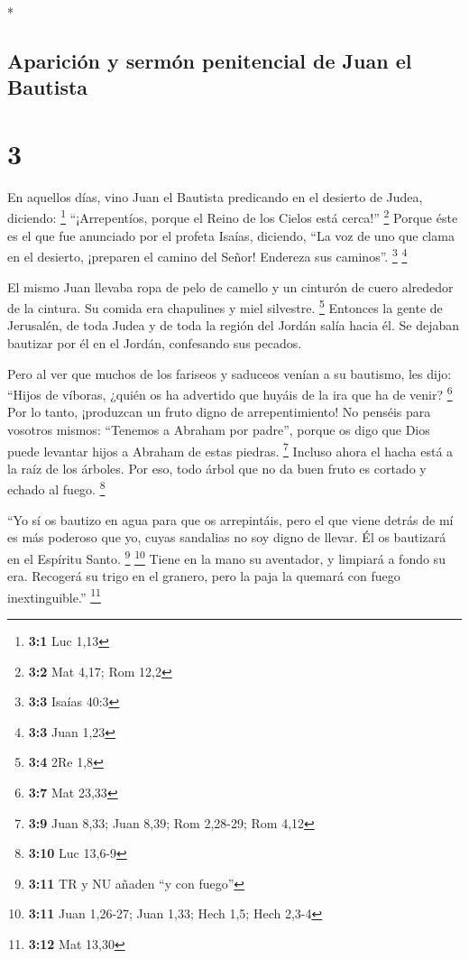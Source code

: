 \begin{paracol}{2}
\begin{otherlanguage}{english}
\end{otherlanguage}

\switchcolumn[0]*

\hypertarget{apariciuxf3n-y-sermuxf3n-penitencial-de-juan-el-bautista}{%
\subsection{Aparición y sermón penitencial de Juan el
Bautista}\label{apariciuxf3n-y-sermuxf3n-penitencial-de-juan-el-bautista}}

\hypertarget{section-4}{%
\section{3}\label{section-4}}

 En aquellos días, vino Juan el Bautista predicando en el
desierto de Judea, diciendo: \footnote{\textbf{3:1} Luc 1,13}
 ``¡Arrepentíos, porque el Reino de los Cielos está
cerca!'' \footnote{\textbf{3:2} Mat 4,17; Rom 12,2} 
Porque éste es el que fue anunciado por el profeta Isaías, diciendo,
``La voz de uno que clama en el desierto, ¡preparen el camino del Señor!
Endereza sus caminos''. \footnote{\textbf{3:3} Isaías 40:3} \footnote{\textbf{3:3}
  Juan 1,23}

 El mismo Juan llevaba ropa de pelo de camello y un
cinturón de cuero alrededor de la cintura. Su comida era chapulines y
miel silvestre. \footnote{\textbf{3:4} 2Re 1,8}  Entonces
la gente de Jerusalén, de toda Judea y de toda la región del Jordán
salía hacia él.  Se dejaban bautizar por él en el Jordán,
confesando sus pecados.

 Pero al ver que muchos de los fariseos y saduceos venían
a su bautismo, les dijo: ``Hijos de víboras, ¿quién os ha advertido que
huyáis de la ira que ha de venir? \footnote{\textbf{3:7} Mat 23,33}
 Por lo tanto, ¡produzcan un fruto digno de
arrepentimiento!  No penséis para vosotros mismos:
``Tenemos a Abraham por padre'', porque os digo que Dios puede levantar
hijos a Abraham de estas piedras. \footnote{\textbf{3:9} Juan 8,33; Juan
  8,39; Rom 2,28-29; Rom 4,12}  Incluso ahora el hacha
está a la raíz de los árboles. Por eso, todo árbol que no da buen fruto
es cortado y echado al fuego. \footnote{\textbf{3:10} Luc 13,6-9}

 ``Yo sí os bautizo en agua para que os arrepintáis, pero
el que viene detrás de mí es más poderoso que yo, cuyas sandalias no soy
digno de llevar. Él os bautizará en el Espíritu Santo. \footnote{\textbf{3:11}
  TR y NU añaden ``y con fuego''} \footnote{\textbf{3:11} Juan 1,26-27;
  Juan 1,33; Hech 1,5; Hech 2,3-4}  Tiene en la mano su
aventador, y limpiará a fondo su era. Recogerá su trigo en el granero,
pero la paja la quemará con fuego inextinguible.'' \footnote{\textbf{3:12}
  Mat 13,30}


\end{paracol}
